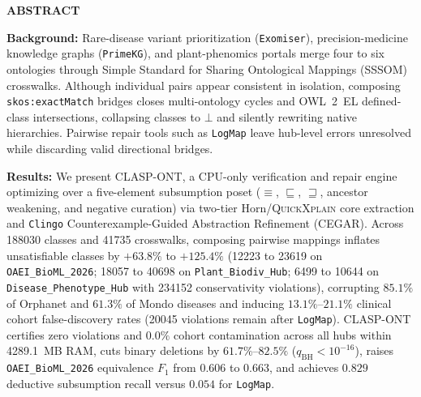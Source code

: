 \documentclass[10pt]{article}
\theoremstyle{accentdef}
\renewenvironment{abstract}{%
  \vspace{4pt}%
  \begin{tcolorbox}[
    enhanced,
    breakable,
    colback=tintbg,
    colframe=hairline,
    boxrule=0.4pt,
    borderline west={2.6pt}{0pt}{accent},
    sharp corners,
    left=11pt,
    right=11pt,
    top=9pt,
    bottom=9pt
  ]%
  {\small\bfseries\color{accent}\lsstyle ABSTRACT}\par\vspace{4pt}%
  \small\linespread{1.05}\selectfont
}{%
  \end{tcolorbox}%
  \vspace{4pt}%
}
\newcommand{\ClaspTotalClassesAll}{188030}
\newcommand{\ClaspTotalMappingsAll}{41735}
\newcommand{\ClaspMaxPeakRssMBAll}{4289.1}
\newcommand{\ClaspDiseasePhenotypeHubRawUnsat}{10644}
\newcommand{\ClaspDiseasePhenotypeHubRawConsViol}{234152}
\newcommand{\ClaspDiseasePhenotypeHubPairwiseUnsat}{6499}
\newcommand{\ClaspDiseasePhenotypeHubBRawHubMONDOCorruptedPct}{61.3}
\newcommand{\ClaspDiseasePhenotypeHubBRawHubORDOCorruptedPct}{85.1}
\newcommand{\ClaspDiseasePhenotypeHubBRawHubChapterFDRPct}{13.1}
\newcommand{\ClaspDiseasePhenotypeHubBLogMapRepairConsViol}{20045}
\newcommand{\ClaspOAEIBioMLRawUnsat}{23619}
\newcommand{\ClaspOAEIBioMLPairwiseUnsat}{12223}
\newcommand{\ClaspOAEIBioMLBRawHubChapterFDRPct}{21.1}
\newcommand{\ClaspOAEIBioMLBLogMapRepairDedSubRecall}{0.054}
\newcommand{\ClaspOAEIBioMLBASPBinaryDeleteEquivFone}{0.606}
\newcommand{\ClaspOAEIBioMLBLexicalLatticeEquivFone}{0.663}
\newcommand{\ClaspOAEIBioMLBLexicalLatticeDedSubRecall}{0.829}
\newcommand{\ClaspPlantBiodivHubRawUnsat}{40698}
\newcommand{\ClaspPlantBiodivHubPairwiseUnsat}{18057}
\begin{document}
\begin{abstract}
\textbf{\color{accent}Background:} Rare-disease variant prioritization (\texttt{Exomiser}), precision-medicine knowledge graphs (\texttt{PrimeKG}), and plant-phenomics portals merge four to six ontologies through Simple Standard for Sharing Ontological Mappings (SSSOM) crosswalks. Although individual pairs appear consistent in isolation, composing \texttt{skos:exactMatch} bridges closes multi-ontology cycles and OWL~2~EL defined-class intersections, collapsing classes to $\bot$ and silently rewriting native hierarchies. Pairwise repair tools such as \texttt{LogMap} leave hub-level errors unresolved while discarding valid directional bridges.

\vspace{3pt}
\textbf{\color{accent}Results:} We present \textsc{CLASP-ONT}, a CPU-only verification and repair engine optimizing over a five-element subsumption poset ($\equiv$, $\sqsubseteq$, $\sqsupseteq$, ancestor weakening, and negative curation) via two-tier Horn/\textsc{QuickXplain} core extraction and \texttt{Clingo} Counterexample-Guided Abstraction Refinement (CEGAR). Across \num{\ClaspTotalClassesAll} classes and \num{\ClaspTotalMappingsAll} crosswalks, composing pairwise mappings inflates unsatisfiable classes by $+63.8\%$ to $+125.4\%$ (\num{\ClaspOAEIBioMLPairwiseUnsat} to \num{\ClaspOAEIBioMLRawUnsat} on \texttt{OAEI\_BioML\_2026}; \num{\ClaspPlantBiodivHubPairwiseUnsat} to \num{\ClaspPlantBiodivHubRawUnsat} on \texttt{Plant\_Biodiv\_Hub}; \num{\ClaspDiseasePhenotypeHubPairwiseUnsat} to \num{\ClaspDiseasePhenotypeHubRawUnsat} on \texttt{Disease\_Phenotype\_Hub} with \num{\ClaspDiseasePhenotypeHubRawConsViol} conservativity violations), corrupting $\ClaspDiseasePhenotypeHubBRawHubORDOCorruptedPct{}\%$ of Orphanet and $\ClaspDiseasePhenotypeHubBRawHubMONDOCorruptedPct{}\%$ of Mondo diseases and inducing $\ClaspDiseasePhenotypeHubBRawHubChapterFDRPct{}\%\text{--}\ClaspOAEIBioMLBRawHubChapterFDRPct{}\%$ clinical cohort false-discovery rates (\num{\ClaspDiseasePhenotypeHubBLogMapRepairConsViol} violations remain after \texttt{LogMap}). \textsc{CLASP-ONT} certifies zero violations and $0.0\%$ cohort contamination across all hubs within \ClaspMaxPeakRssMBAll{}~MB RAM, cuts binary deletions by $61.7\%\text{--}82.5\%$ ($q_{\mathrm{BH}} < 10^{-16}$), raises \texttt{OAEI\_BioML\_2026} equivalence $F_1$ from \ClaspOAEIBioMLBASPBinaryDeleteEquivFone{} to \ClaspOAEIBioMLBLexicalLatticeEquivFone{}, and achieves $\ClaspOAEIBioMLBLexicalLatticeDedSubRecall{}$ deductive subsumption recall versus $\ClaspOAEIBioMLBLogMapRepairDedSubRecall{}$ for \texttt{LogMap}.


\end{abstract}
\end{document}
